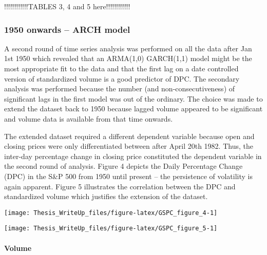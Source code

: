 \documentclass[11pt,preprint, authoryear]{elsarticle}
\let\origfigure\figure
\let\endorigfigure\endfigure
\renewenvironment{figure}[1][2] {
    \expandafter\origfigure\expandafter[H]
} {
    \endorigfigure
}
\numberwithin{equation}{section}
\numberwithin{figure}{section}
\numberwithin{table}{section}
\begin{document}
!!!!!!!!!!!!TABLES 3, 4 and 5 here!!!!!!!!!!!!

\hypertarget{onwards-arch-model}{%
\subsubsection{1950 onwards -- ARCH model}\label{onwards-arch-model}}

A second round of time series analysis was performed on all the data
after Jan 1st 1950 which revealed that an ARMA(1,0) GARCH(1,1) model
might be the most appropriate fit to the data and that the first lag on
a date controlled version of standardized volume is a good predictor of
DPC. The secondary analysis was performed because the number (and
non-consecutiveness) of significant lags in the first model was out of
the ordinary. The choice was made to extend the dataset back to 1950
because lagged volume appeared to be significant and volume data is
available from that time onwards.

The extended dataset required a different dependent variable because
open and closing prices were only differentiated between after April
20th 1982. Thus, the inter-day percentage change in closing price
constituted the dependent variable in the second round of analysis.
Figure 4 depicts the Daily Percentage Change (DPC) in the S\&P 500 from
1950 until present -- the persistence of volatility is again apparent.
Figure 5 illustrates the correlation between the DPC and standardized
volume which justifies the extension of the dataset.

\begin{figure}[H]

{\centering \texttt{[image: Thesis\_WriteUp\_files/figure-latex/GSPC\_figure\_4-1]} 

}

\caption{S and P 500 Daily Percentage Change 1950 – Present \label{Figure4}}\label{fig:GSPC_figure_4}
\end{figure}

\begin{figure}[H]

{\centering \texttt{[image: Thesis\_WriteUp\_files/figure-latex/GSPC\_figure\_5-1]} 

}

\caption{Standardized volume (red) and absolute logDiff (green) \label{Figure5}}\label{fig:GSPC_figure_5}
\end{figure}

\hypertarget{volume}{%
\paragraph{Volume}\label{volume}}
\end{document}
